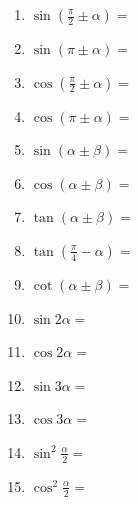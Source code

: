 \documentclass[a4paper,12pt]{article}
\begin{document}
    \pagestyle{empty}

    \begin{minipage}[t]{0.30\textwidth}
        \begin{enumerate}[leftmargin=*, itemsep=1.2em]
            \item $\sin (\displaystyle\frac{\pi}{2} \pm \alpha) =$
            \item $\sin (\pi \pm \alpha) =$
            \item $\cos (\displaystyle\frac{\pi}{2} \pm \alpha) =$
            \item $\cos (\pi \pm \alpha) =$
            \item $\sin (\alpha \pm \beta) =$
            \item $\cos (\alpha \pm \beta) =$
            \item $\tan (\alpha \pm \beta) =$
            \item $\tan (\displaystyle\frac{\pi}{4} - \alpha) =$
            \item $\cot (\alpha \pm \beta) =$
            \item $\sin 2\alpha =$
            \item $\cos 2\alpha =$
            \item $\sin 3\alpha =$
            \item $\cos 3\alpha =$
            \item $\sin^2 \displaystyle\frac{\alpha}{2} =$
            \item $\cos^2 \displaystyle\frac{\alpha}{2} =$
        \end{enumerate}
    \end{minipage}
    \hfill
    \begin{minipage}[t]{0.30\textwidth}
        \begin{enumerate}[leftmargin=*, itemsep=1.1em]
        \end{enumerate}
    \end{minipage}
    \hfill
    \begin{minipage}[t]{0.30\textwidth}
        \begin{enumerate}[leftmargin=*, itemsep=1.1em]
        \end{enumerate}
    \end{minipage}
\end{document}
